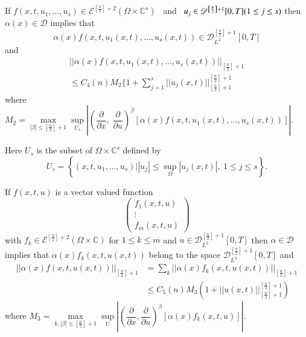 \begin{corollary}\label{chap5-sec2-coro2}%
If $f(x, t, u_1, \ldots, u_s ) \in
\mathscr{E}^{\left[\frac{n}{2}\right] 
  + 2}( \Omega \times \mathbb{C}^s)$~ and~ $u_j \in
\mathscr{D}^{\left[\frac{n}{2}\right] + 1}\break [0, T] (1 \leq j \leq s)$
then $\alpha 
(x) \in \mathscr{D}$ implies that 
$$
\alpha(x) f(x, t, u_1(x,t), \ldots , u_s (x, t)) \in 
\mathscr{D}^{\left[\frac{n}{2}\right]+1}_{L^2} [0, T] 
$$
and 
\begin{gather*}
|| \alpha(x) f (x, t, u_1 (x, t), \ldots , u_s(x, t))
||_{\left[\frac{n}{2}\right]+1}  \\ 
\leq C_4 (n) M_2 \{ 1+ \sum\limits^s_{j=1} || u_j (x, t)
||^{\left[\frac{n}{2}\right]+1}_{\left[\frac{n}{2}\right]+1}\tag{2.10} 
\label{chap5-eq2.10}   
\end{gather*}
where\pageoriginale $M_2 = \max\limits_{| \beta|\leq
  \left[\frac{n}{2}\right]+1} \sup\limits_{U_s} |
\left(\dfrac{\partial}{\partial x}, \; 
\dfrac{\partial}{\partial u}\right)^\beta [\alpha(x) f(x, t, u_1(x, t),
  \ldots, u_s (x, t))]|$. 
\end{corollary}

Here $U_s$ is the subset of $\Omega \times \mathbb{C}^s$ defined by 
\begin{equation*}
U_s = \left\{ (x, t, u_1, \ldots , u_s) \bigg| | u_j | \leq
\sup\limits_\Omega | u_j (x, t)|, ~ 1 \leq j \leq s
\right\}. \tag{2.11}\label{chap5-eq2.11}   
\end{equation*}

\begin{corollary}\label{chap5-sec2-coro3}%
If $f(x, t, u)$ is a vector valued function
$$ 
\begin{pmatrix}
f_1(x, t, u) \\ 
\vdots \\
f_m(x, t, u)
\end{pmatrix}
$$
with $f_k \in \mathscr{E}^{\left[\frac{n}{2}\right] + 2}
(\Omega \times 
\mathbb{C})$ for $1 \leq k \leq m$ and $u \in
\mathscr{D}^{\left[\frac{n}{2}\right]+1}_{L^2} [0, T]$ then $\alpha
\in \mathscr{D}$ implies that $\alpha (x) f_k (x, t, u(x, t))$
belong to the space $\mathscr{D}^{\left[\frac{n}{2}\right]+1}_{L^2}
[0, T]$ and   
\begin{align*}
|| \alpha (x) f (x, t, u(x, t)) ||_{\left[\frac{n}{2}\right]+1} & =
\sum_k || \alpha (x) f_k (x, t, u(x, t)) ||_{\left[\frac{n}{2}\right]+1}\\ 
&  \leq C_5 (n) M_3(1+ || u (x, t)
  ||^{\left[\frac{n}{2}\right]+1}_{\left[\frac{n}{2}\right]+1})
\tag{2.12}\label{chap5-eq2.12}  
\end{align*}
where $M_3 = \max\limits_{k,|\beta | \leq \left[\frac{n}{2}\right]+1}
\sup\limits_U | \left(\dfrac{\partial}{\partial x},
\dfrac{\partial}{\partial  u}\right)^\beta [ \alpha (x) f_k (x, t, u)]|$.  
\end{corollary}

